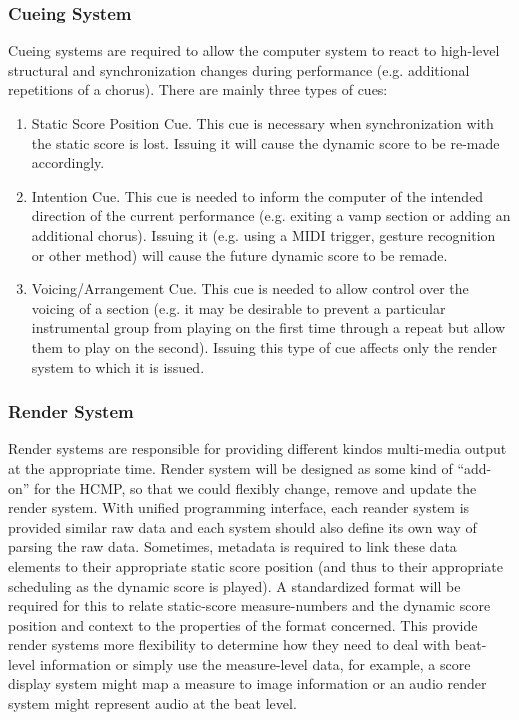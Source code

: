 \subsubsection{Cueing System}
Cueing systems are required to allow the computer system to react to high-level
structural and synchronization changes during performance (e.g. additional
repetitions of a chorus). There are mainly three types of cues:
\begin{enumerate}
  \item Static Score Position Cue. This cue is necessary when synchronization with the
static score is lost. Issuing it will cause the dynamic score to be re-made
accordingly.
  \item Intention Cue. This cue is needed to inform the computer of the intended
direction of the current performance (e.g. exiting a vamp section or adding an
additional chorus). Issuing it (e.g. using a MIDI trigger, gesture recognition or
other method) will cause the future dynamic score to be remade.
  \item Voicing/Arrangement Cue. This cue is needed to allow control over the voicing
of a section (e.g. it may be desirable to prevent a particular instrumental group
from playing on the first time through a repeat but allow them to play on the
second). Issuing this type of cue affects only the render system to which it is
issued.
\end{enumerate}

\subsubsection{Render System}
Render systems are responsible for providing different kindos multi-media output 
at the appropriate time. Render system will be designed as some kind of ``add-on'' 
for the HCMP, so that we could flexibly change, remove and update the render system.
With unified programming interface, each reander system is provided similar raw 
data and each system should also define its own way of parsing the raw data.
Sometimes, metadata is required to link these data elements to their appropriate 
static score position (and thus to
their appropriate scheduling as the dynamic score is played). A standardized
format will be required for this to relate static-score measure-numbers and the
dynamic score position and context to the properties of the format concerned. This
provide render systems more flexibility to determine how they need to deal with 
beat-level information or simply use the measure-level data, for example, a score 
display system might map a measure to image information or an audio render 
system might represent audio at the beat level.

